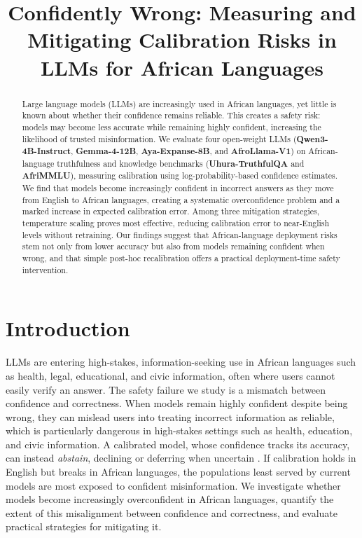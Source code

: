 \documentclass[pmlr]{jmlr}%
\title[Confidently Wrong: Calibration Risks in LLMs for African Languages]{Confidently Wrong: Measuring and Mitigating Calibration Risks in LLMs for African Languages}
\author{\Name{Anonymous Author(s)}}
\begin{document}
\maketitle
\thispagestyle{jmlrtps}%
\pagestyle{plain}%
\vspace{-2.2em}%

\begin{abstract}
Large language models (LLMs) are increasingly used in African languages, yet little is known about
whether their confidence remains reliable. This creates a safety risk: models may become less
accurate while remaining highly confident, increasing the likelihood of trusted misinformation. We
evaluate four open-weight LLMs (\textbf{Qwen3-4B-Instruct}, \textbf{Gemma-4-12B},
\textbf{Aya-Expanse-8B}, and \textbf{AfroLlama-V1}) on African-language truthfulness and knowledge
benchmarks (\textbf{Uhura-TruthfulQA} and \textbf{AfriMMLU}), measuring calibration using
log-probability-based confidence estimates. We find that models become increasingly confident in
incorrect answers as they move from English to African languages, creating a systematic
overconfidence problem and a marked increase in expected calibration error. Among three mitigation
strategies, temperature scaling proves most effective, reducing calibration error to near-English
levels without retraining. Our findings suggest that African-language deployment risks stem not only
from lower accuracy but also from models remaining confident when wrong, and that simple post-hoc
recalibration offers a practical deployment-time safety intervention.
\end{abstract}

\section{Introduction}
LLMs are entering high-stakes, information-seeking use in African languages such as health, legal,
educational, and civic information, often where users cannot easily verify an answer. The safety
failure we study is a mismatch between confidence and correctness. When models remain highly
confident despite being wrong, they can mislead users into treating incorrect information as
reliable, which is particularly dangerous in high-stakes settings such as health, education, and
civic information. A calibrated model, whose confidence tracks its accuracy, can instead
\emph{abstain}, declining or deferring when uncertain \citep{tomani2024}. If calibration holds in
English but breaks in African languages, the populations least served by current models are most
exposed to confident misinformation. We investigate whether models become increasingly overconfident
in African languages, quantify the extent of this misalignment between confidence and correctness,
and evaluate practical strategies for mitigating it.
\end{document}
